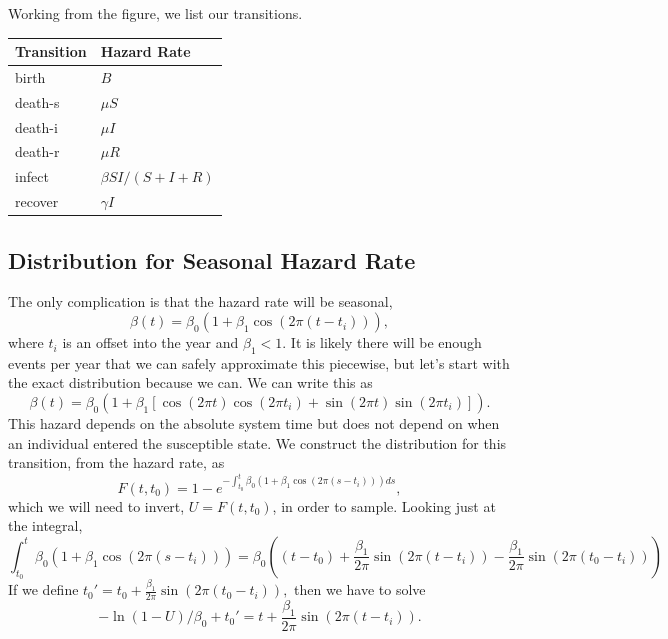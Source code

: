 \documentclass{article}
\begin{document}
Working from the figure, we list our transitions. \\
\begin{tabular}{ll}
  \hline
  Transition & Hazard Rate \\
  \hline
  birth & $B$ \\
  death-s & $\mu S$ \\
  death-i & $\mu I$ \\
  death-r & $\mu R$ \\
  infect & $\beta SI/(S+I+R)$ \\
  recover & $\gamma I$ \\
  \hline
\end{tabular}


\subsection{Distribution for Seasonal Hazard Rate}
The only complication is that the hazard rate will be seasonal,
\begin{equation}
  \beta(t)=\beta_0(1+\beta_1 \cos(2\pi (t-t_i))),
\end{equation}
where $t_i$ is an offset into the year and $\beta_1<1$. It is likely there will be enough
events per year that we can safely approximate this piecewise, but let's start
with the exact distribution because we can.
We can write this as
\begin{equation}
  \beta(t)=\beta_0(1+\beta_1 [\cos(2\pi t) \cos(2\pi t_i)+\sin(2\pi t) \sin(2\pi t_i)]).
\end{equation}
This hazard depends on the absolute system time but does not depend on
when an individual entered the susceptible state. We construct the
distribution for this transition, from the hazard rate, as
\begin{equation}
  F(t,t_0)=1-e^{-\int_{t_0}^t\beta_0(1+\beta_1 \cos(2\pi (s-t_i)))ds},
\end{equation}
which we will need to invert, $U=F(t,t_0)$, in order to sample.
Looking just at the integral,
\begin{equation}
  \int_{t_0}^t\beta_0(1+\beta_1 \cos(2\pi (s-t_i)))=\beta_0\left((t-t_0)+\frac{\beta_1}{2\pi}\sin(2\pi (t-t_i))-\frac{\beta_1}{2\pi}\sin(2\pi (t_0-t_i))\right)
\end{equation}
If we define $t_0'=t_0+\frac{\beta_1}{2\pi}\sin(2\pi (t_0-t_i)),$ then we
have to solve
\begin{equation}
  -\ln(1-U)/\beta_0+t_0'=t+\frac{\beta_1}{2\pi}\sin(2\pi (t-t_i)).
\end{equation}
\end{document}
